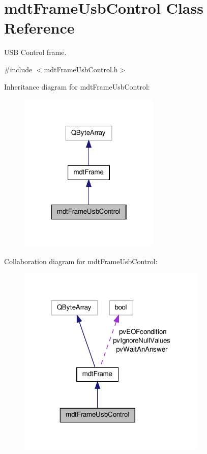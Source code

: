 \hypertarget{classmdt_frame_usb_control}{\section{mdt\-Frame\-Usb\-Control Class Reference}
\label{classmdt_frame_usb_control}
}


U\-S\-B Control frame.  




{\ttfamily \#include $<$mdt\-Frame\-Usb\-Control.\-h$>$}



Inheritance diagram for mdt\-Frame\-Usb\-Control\-:
\nopagebreak
\begin{figure}[H]
\begin{center}
\leavevmode
\includegraphics[width=190pt]{classmdt_frame_usb_control__inherit__graph}
\end{center}
\end{figure}


Collaboration diagram for mdt\-Frame\-Usb\-Control\-:
\nopagebreak
\begin{figure}[H]
\begin{center}
\leavevmode
\includegraphics[width=256pt]{classmdt_frame_usb_control__coll__graph}
\end{center}
\end{figure}
